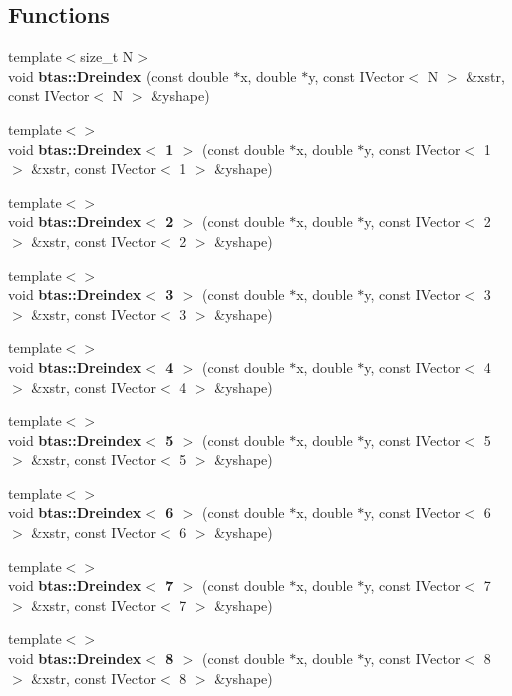 \subsection*{Functions}
\begin{DoxyCompactItemize}
\item 
{\footnotesize template$<$size\-\_\-t N$>$ }\\void {\bf btas\-::\-Dreindex} (const double $\ast$x, double $\ast$y, const I\-Vector$<$ N $>$ \&xstr, const I\-Vector$<$ N $>$ \&yshape)
\item 
{\footnotesize template$<$$>$ }\\void {\bf btas\-::\-Dreindex$<$ 1 $>$} (const double $\ast$x, double $\ast$y, const I\-Vector$<$ 1 $>$ \&xstr, const I\-Vector$<$ 1 $>$ \&yshape)
\item 
{\footnotesize template$<$$>$ }\\void {\bf btas\-::\-Dreindex$<$ 2 $>$} (const double $\ast$x, double $\ast$y, const I\-Vector$<$ 2 $>$ \&xstr, const I\-Vector$<$ 2 $>$ \&yshape)
\item 
{\footnotesize template$<$$>$ }\\void {\bf btas\-::\-Dreindex$<$ 3 $>$} (const double $\ast$x, double $\ast$y, const I\-Vector$<$ 3 $>$ \&xstr, const I\-Vector$<$ 3 $>$ \&yshape)
\item 
{\footnotesize template$<$$>$ }\\void {\bf btas\-::\-Dreindex$<$ 4 $>$} (const double $\ast$x, double $\ast$y, const I\-Vector$<$ 4 $>$ \&xstr, const I\-Vector$<$ 4 $>$ \&yshape)
\item 
{\footnotesize template$<$$>$ }\\void {\bf btas\-::\-Dreindex$<$ 5 $>$} (const double $\ast$x, double $\ast$y, const I\-Vector$<$ 5 $>$ \&xstr, const I\-Vector$<$ 5 $>$ \&yshape)
\item 
{\footnotesize template$<$$>$ }\\void {\bf btas\-::\-Dreindex$<$ 6 $>$} (const double $\ast$x, double $\ast$y, const I\-Vector$<$ 6 $>$ \&xstr, const I\-Vector$<$ 6 $>$ \&yshape)
\item 
{\footnotesize template$<$$>$ }\\void {\bf btas\-::\-Dreindex$<$ 7 $>$} (const double $\ast$x, double $\ast$y, const I\-Vector$<$ 7 $>$ \&xstr, const I\-Vector$<$ 7 $>$ \&yshape)
\item 
{\footnotesize template$<$$>$ }\\void {\bf btas\-::\-Dreindex$<$ 8 $>$} (const double $\ast$x, double $\ast$y, const I\-Vector$<$ 8 $>$ \&xstr, const I\-Vector$<$ 8 $>$ \&yshape)

\end{DoxyCompactItemize}
